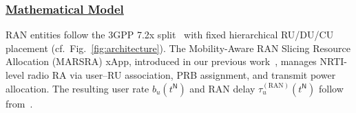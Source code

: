 \documentclass[12pt,lettersize,journal,onecolumn]{IEEEtran}
\begin{document}
\subsubsection{\underline{Mathematical Model}} \label{ran-model-subsection}
RAN entities follow the 3GPP 7.2x split~\cite{3gpp23ts23501,oran23architecture} with fixed hierarchical RU/DU/CU placement (cf.\ Fig.~\ref{fig:architecture}). The Mobility-Aware RAN Slicing Resource Allocation (MARSRA) xApp, introduced in our previous work~\cite{camad24ebrahimi},
manages NRTI-level radio RA via user--RU association, PRB assignment, and transmit power allocation.
The resulting user rate $b_u(t^\mathsf{N})$ and RAN delay $\tau^{\mathrm{(RAN)}}_{u}(t^\mathsf{N})$ follow from~\cite[Sec.~II]{camad24ebrahimi}.
\end{document}
